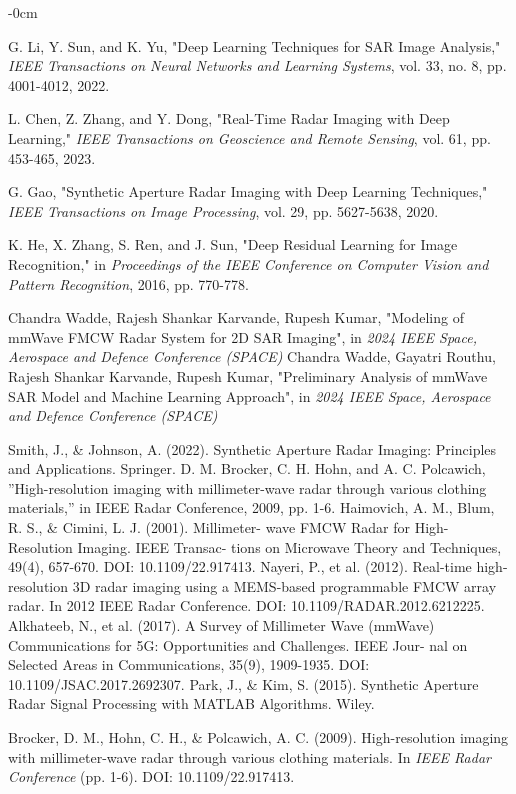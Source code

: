 \documentclass[journal,article,submit,pdftex,moreauthors]{Definitions/mdpi}
\begin{document}
\begin{adjustwidth}{-\extralength}{0cm}
\begin{thebibliography}{999}
G. Li, Y. Sun, and K. Yu, "Deep Learning Techniques for SAR Image Analysis," \textit{IEEE Transactions on Neural Networks and Learning Systems}, vol. 33, no. 8, pp. 4001-4012, 2022.

L. Chen, Z. Zhang, and Y. Dong, "Real-Time Radar Imaging with Deep Learning," \textit{IEEE Transactions on Geoscience and Remote Sensing}, vol. 61, pp. 453-465, 2023.

G. Gao, "Synthetic Aperture Radar Imaging with Deep Learning Techniques," \textit{IEEE Transactions on Image Processing}, vol. 29, pp. 5627-5638, 2020.

K. He, X. Zhang, S. Ren, and J. Sun, "Deep Residual Learning for Image Recognition," in \textit{Proceedings of the IEEE Conference on Computer Vision and Pattern Recognition}, 2016, pp. 770-778.


Chandra Wadde, Rajesh Shankar Karvande, Rupesh Kumar, "Modeling of mmWave FMCW Radar System for 2D SAR Imaging", in \textit{2024 IEEE Space, Aerospace and Defence Conference (SPACE)}
Chandra Wadde, Gayatri Routhu, Rajesh Shankar Karvande, Rupesh Kumar, "Preliminary Analysis of mmWave SAR Model and Machine Learning Approach", in \textit{2024 IEEE Space, Aerospace and Defence Conference (SPACE)}

Smith, J., \& Johnson, A. (2022). Synthetic Aperture Radar Imaging:
Principles and Applications. Springer.
D. M. Brocker, C. H. Hohn, and A. C. Polcawich, ”High-resolution
imaging with millimeter-wave radar through various clothing materials,”
in IEEE Radar Conference, 2009, pp. 1-6.
 Haimovich, A. M., Blum, R. S., \& Cimini, L. J. (2001). Millimeter-
wave FMCW Radar for High-Resolution Imaging. IEEE Transac-
tions on Microwave Theory and Techniques, 49(4), 657-670. DOI:
10.1109/22.917413.
 Nayeri, P., et al. (2012). Real-time high-resolution 3D radar imaging
using a MEMS-based programmable FMCW array radar. In 2012 IEEE
Radar Conference. DOI: 10.1109/RADAR.2012.6212225.
 Alkhateeb, N., et al. (2017). A Survey of Millimeter Wave (mmWave)
Communications for 5G: Opportunities and Challenges. IEEE Jour-
nal on Selected Areas in Communications, 35(9), 1909-1935. DOI:
10.1109/JSAC.2017.2692307.
 Park, J., \& Kim, S. (2015). Synthetic Aperture Radar Signal Processing
with MATLAB Algorithms. Wiley.

 Brocker, D. M., Hohn, C. H., \& Polcawich, A. C. (2009). High-resolution imaging with millimeter-wave radar through various clothing materials. In \textit{IEEE Radar Conference} (pp. 1-6). DOI: 10.1109/22.917413.


\end{thebibliography}
\end{adjustwidth}
\end{document}
